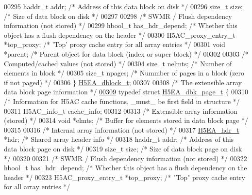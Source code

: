 \begin{DoxyCode}
00295     haddr\_t     addr;           \textcolor{comment}{/* Address of this data block on disk                   */}
00296     \textcolor{keywordtype}{size\_t}      size;           \textcolor{comment}{/* Size of data block on disk                           */}
00297 
00298     \textcolor{comment}{/* SWMR / Flush dependency information (not stored) */}
00299     hbool\_t     has\_hdr\_depend; \textcolor{comment}{/* Whether this object has a flush dependency on the header */}
00300     H5AC\_proxy\_entry\_t *top\_proxy;      \textcolor{comment}{/* 'Top' proxy cache entry for all array entries */}
00301     \textcolor{keywordtype}{void}        *parent;        \textcolor{comment}{/* Parent object for data block (index or super block)  */}
00302 
00303     \textcolor{comment}{/* Computed/cached values (not stored) */}
00304     \textcolor{keywordtype}{size\_t}      nelmts;         \textcolor{comment}{/* Number of elements in block                */}
00305     \textcolor{keywordtype}{size\_t}      npages;         \textcolor{comment}{/* Nummber of pages in a block (zero if not paged) */}
00306 \} \hyperlink{struct_h5_e_a__dblock__t}{H5EA\_dblock\_t};
00307 
00308 \textcolor{comment}{/* The extensible array data block page information */}
\hyperlink{struct_h5_e_a__dbk__page__t}{00309} \textcolor{keyword}{typedef} \textcolor{keyword}{struct }\hyperlink{struct_h5_e_a__dbk__page__t}{H5EA\_dbk\_page\_t} \{
00310     \textcolor{comment}{/* Information for H5AC cache functions, \_must\_ be first field in structure */}
00311     H5AC\_info\_t cache\_info;
00312 
00313     \textcolor{comment}{/* Extensible array information (stored) */}
00314     \textcolor{keywordtype}{void}        *elmts;         \textcolor{comment}{/* Buffer for elements stored in data block page */}
00315 
00316     \textcolor{comment}{/* Internal array information (not stored) */}
00317     \hyperlink{struct_h5_e_a__hdr__t}{H5EA\_hdr\_t}  *hdr;           \textcolor{comment}{/* Shared array header info                         */}
00318     haddr\_t     addr;           \textcolor{comment}{/* Address of this data block page on disk          */}
00319     \textcolor{keywordtype}{size\_t}      size;           \textcolor{comment}{/* Size of data block page on disk                  */}
00320 
00321     \textcolor{comment}{/* SWMR / Flush dependency information (not stored) */}
00322     hbool\_t     has\_hdr\_depend; \textcolor{comment}{/* Whether this object has a flush dependency on the header */}
00323     H5AC\_proxy\_entry\_t *top\_proxy;      \textcolor{comment}{/* "Top" proxy cache entry for all array entries */}

\end{DoxyCode}
